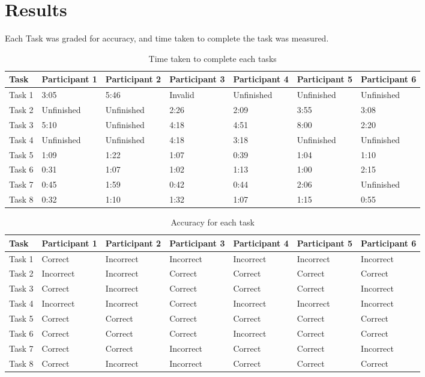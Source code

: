\section{Results}

Each Task was graded for accuracy, and time taken to complete the task was measured.
\begin{table}[tbh]
\centering
\begin{tabular}{l|*{6}{l|}}
Task & Participant 1 & Participant  2 & Participant  3 & Participant  4 & Participant 5 & Participant 6 \\
\hline
Task 1 & 3:05 & 5:46 & Invalid & Unfinished & Unfinished & Unfinished \\
Task 2 & Unfinished & Unfinished & 2:26 & 2:09 & 3:55 & 3:08 \\
Task 3 & 5:10 & Unfinished & 4:18 & 4:51 & 8:00 & 2:20 \\
Task 4 & Unfinished & Unfinished & 4:18 & 3:18 & Unfinished & Unfinished \\
Task 5 & 1:09 & 1:22 & 1:07 & 0:39 & 1:04 & 1:10 \\
Task 6 & 0:31 & 1:07 & 1:02 & 1:13 & 1:00 & 2:15 \\
Task 7 & 0:45 & 1:59 & 0:42 & 0:44 & 2:06 & Unfinished \\
Task 8 & 0:32 & 1:10 & 1:32 & 1:07 & 1:15 & 0:55 \\
\end{tabular}
\caption{Time taken to complete each tasks}
\label{res_times}
\end{table}

\begin{table}[tbh]
\centering
\begin{tabular}{l|*{6}{l|}}
Task & Participant 1 & Participant  2 & Participant  3 & Participant  4 & Participant 5 & Participant 6 \\
\hline
Task 1 & Correct & Incorrect & Incorrect & Incorrect & Incorrect & Incorrect\\
Task 2 & Incorrect & Incorrect & Correct & Correct & Correct & Correct\\
Task 3 & Correct & Incorrect & Correct & Correct & Correct & Incorrect\\
Task 4 & Incorrect & Incorrect & Correct & Incorrect & Incorrect & Incorrect\\
Task 5 & Correct & Correct & Correct & Correct & Correct & Correct\\
Task 6 & Correct & Correct & Correct & Incorrect & Correct & Correct\\
Task 7 & Correct & Correct & Incorrect & Correct & Correct & Incorrect\\
Task 8 & Correct & Incorrect & Incorrect & Correct & Correct & Correct\\
\end{tabular}
\caption{Accuracy for each task}
\label{res_acc}
\end{table}

